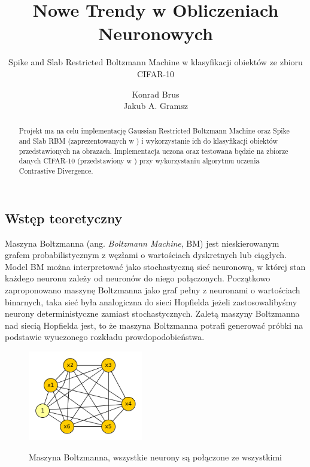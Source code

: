\documentclass[a4paper,10pt]{report}
\title{Nowe Trendy w Obliczeniach Neuronowych}
\subtitle{Spike and Slab Restricted Boltzmann Machine w klasyfikacji obiektów ze zbioru CIFAR-10}
\author{Konrad Brus \\ Jakub A. Gramsz}
\begin{document}
\maketitle

\begin{abstract}
Projekt ma na celu implementację Gaussian Restricted Boltzmann Machine oraz Spike and Slab RBM 
(zaprezentowanych w \cite{courville2013spike}) i wykorzystanie ich do klasyfikacji obiektów
przedstawionych na obrazach. Implementacja uczona oraz testowana będzie na zbiorze danych CIFAR-10
(przedstawiony w \cite{cifar}) przy wykorzystaniu algorytmu uczenia Contrastive Divergence.
\end{abstract}

\chapter*{}

\section{Wstęp teoretyczny}
Maszyna Boltzmanna (ang. \textit{Boltzmann Machine}, BM) jest nieskierowanym grafem probabilistycznym z
węzłami o wartościach dyskretnych lub ciągłych. Model BM można interpretować jako stochastyczną sieć
neuronową, w której stan każdego neuronu zależy od neuronów do niego połączonych. Początkowo
zaproponowano maszynę Boltzmanna jako graf pełny z neuronami o wartościach binarnych, taka sieć była
analogiczna do sieci Hopfielda jeżeli zastosowalibyśmy neurony deterministyczne zamiast stochastycznych.
Zaletą maszyny Boltzmanna nad siecią Hopfielda jest, to że maszyna Boltzmanna potrafi generować próbki
na podstawie wyuczonego rozkładu prowdopodobieństwa.

\begin{figure}
 \centering
 \includegraphics[width=5cm]{imgs/bm.png}
 \label{fig:bm}
\caption{Maszyna Boltzmanna, wszystkie neurony są połączone ze wszystkimi}
\end{figure} 
\end{document}
